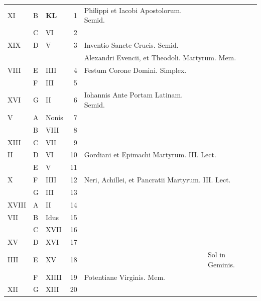 \documentclass[11pt,openany]{book}
\begin{document}
\begin{center}
\begin{tabular}{l | l | l | r | l l}
\color{Red} XI & B & \textbf{\color{Red} K\color{Blue}L} & 1 & Philippi et Iacobi Apostolorum. Semid. \\
\color{Red}  & C & \color{Red} VI & 2 & \\
\color{Red} XIX & D & \color{Red} V & 3 & Inventio Sancte Crucis. Semid. \\
 &  &  &  & \multicolumn{2}{l}{\qquad Alexandri Evencii, et Theodoli. \color{Red} Martyrum. \color{black} Mem.} \\
\color{Red} VIII & E & \color{Red} IIII & 4 & Festum Corone Domini. Simplex. & \color{Red} \\
\color{Red}  & F & \color{Red} III & 5 & & \color{Red} \\
\color{Red} XVI & G & \color{Red} II & 6 & \color{Red} Iohannis Ante Portam Latinam. Semid. \\
\color{Red} V & \color{Red} A & \color{Red} Nonis & 7 & & \color{Red} \\
\color{Red}  & B & \color{Red} VIII & 8 & & \color{Red} \\
\color{Red} XIII & C & \color{Red} VII & 9 & & \color{Red} \\
\color{Red} II & D & \color{Red} VI & 10 & \multicolumn{2}{l}{Gordiani et Epimachi Martyrum. III. Lect.} \color{Red} \\
\color{Red}  & E & \color{Red} V & 11 & & \color{Red} \\
\color{Red} X & F & \color{Red} IIII & 12 & \multicolumn{2}{l}{Neri, Achillei, et Pancratii Martyrum. III. Lect.} \color{Red} \\
\color{Red}  & G & \color{Red} III & 13 & & \color{Red} \\
\color{Red} XVIII & \color{Red} A & \color{Red} II & 14 & & \color{Red} \\
\color{Red} VII & B & \color{Red} Idus & 15 & & \color{Red} \\
\color{Red}  & C & \color{Red} XVII & 16 &  & \color{Red} \\
\color{Red} XV & D & \color{Red} XVI & 17 & & \color{Red} \\
\color{Red} IIII & E & \color{Red} XV & 18 & & Sol in Geminis. \color{Red} \\
\color{Red}  & F & \color{Red} XIIII & 19 & Potentiane Virginis. Mem. & \color{Red} \\
\color{Red} XII & G & \color{Red} XIII & 20 & & \color{Red} \\

\end{tabular}
\end{center}
\end{document}
